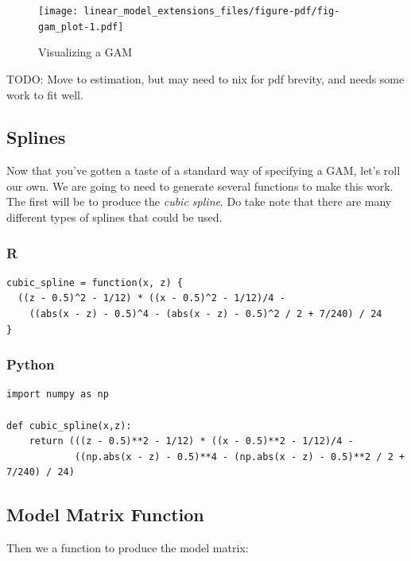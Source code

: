\documentclass[
  letterpaper,
]{krantz}
\begin{document}
\begin{figure}

{\centering \texttt{[image: linear\_model\_extensions\_files/figure-pdf/fig-gam\_plot-1.pdf]}

}

\caption{\label{fig-gam_plot}Visualizing a GAM}

\end{figure}

TODO: Move to estimation, but may need to nix for pdf brevity, and needs
some work to fit well.

\subsection{Splines}\label{sec-gam-splines}

Now that you've gotten a taste of a standard way of specifying a GAM,
let's roll our own. We are going to need to generate several functions
to make this work. The first will be to produce the \emph{cubic spline}.
Do take note that there are many different types of splines that could
be used.

\subsubsection{R}

\begin{verbatim}
cubic_spline = function(x, z) {
  ((z - 0.5)^2 - 1/12) * ((x - 0.5)^2 - 1/12)/4 -
    ((abs(x - z) - 0.5)^4 - (abs(x - z) - 0.5)^2 / 2 + 7/240) / 24
}
\end{verbatim}

\subsubsection{Python}

\begin{verbatim}
import numpy as np

def cubic_spline(x,z):
    return (((z - 0.5)**2 - 1/12) * ((x - 0.5)**2 - 1/12)/4 -
            ((np.abs(x - z) - 0.5)**4 - (np.abs(x - z) - 0.5)**2 / 2 + 7/240) / 24)
\end{verbatim}

\subsection{Model Matrix Function}\label{sec-gam-model-matrix}

Then we a function to produce the model matrix:
\end{document}
